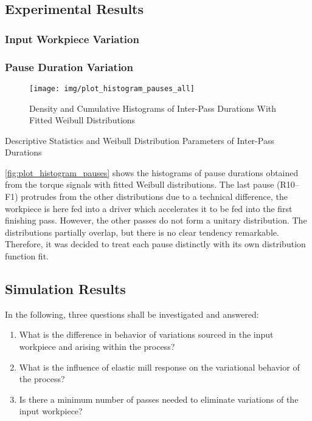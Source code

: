 \subsection{Experimental Results}\label{subsec:experimental-results}

\subsubsection{Input Workpiece Variation}\label{subsubsec:input-workpiece-variation}

\subsubsection{Pause Duration Variation}\label{subsubsec:pause-duration-variation}

\begin{figure}
    \centering
    \texttt{[image: img/plot\_histogram\_pauses\_all]}
    \caption{Density and Cumulative Histograms of Inter-Pass Durations With Fitted Weibull Distributions}
    \label{fig:plot_histogram_pauses}
\end{figure}

\begin{table}
    \centering
    \caption{Descriptive Statistics and Weibull Distribution Parameters of Inter-Pass Durations}
    \label{tab:pause_distributions}
    
\end{table}


\autoref{fig:plot_histogram_pauses} shows the histograms of pause durations obtained from the torque signals with fitted Weibull distributions.
The last pause (R10--F1) protrudes from the other distributions due to a technical difference, the workpiece is here fed into a driver which accelerates it to be fed into the first finishing pass.
However, the other passes do not form a unitary distribution.
The distributions partially overlap, but there is no clear tendency remarkable.
Therefore, it was decided to treat each pause distinctly with its own distribution function fit.

\subsection{Simulation Results}\label{subsec:simulation-results}

In the following, three questions shall be investigated and answered:
\begin{enumerate}
    \item What is the difference in behavior of variations sourced in the input workpiece and arising within the process?
    \item What is the influence of elastic mill response on the variational behavior of the process?
    \item Is there a minimum number of passes needed to eliminate variations of the input workpiece?
\end{enumerate}

